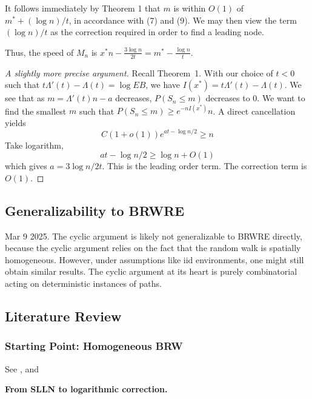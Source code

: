 \begin{tcolorbox}[title=,colback=gray!10,colframe=black,breakable]
It follows immediately by Theorem 1 that $m$ is within $O(1)$ of $m^*+(\log n) / t$, in accordance with (7) and (9). We may then view the term $(\log n) / t$ as the correction required in order to find a leading node.
\end{tcolorbox}

Thus, the speed of $M_n$ is $x^* n - \frac{3 \log n}{2t} = m^* - \frac{\log n}{t}$.

\begin{proof}[A slightly more precise argument]
    Recall Theorem~1. With our choice of $t<0$ such that $t \Lambda'(t) - \Lambda(t) = \log E B$, we have $I(x^*) = t \Lambda'(t) - \Lambda(t)$. We see that as $m = \Lambda'(t) n - a$ decreases, $P(S_n \le m)$ decreases to $0$. We want to find the smallest $m$ such that $P(S_n \le m) \geq e^{- n I(x^*)} n$. A direct cancellation yields
    \[
        C (1 + o(1)) e^{a t - \log n / 2} \geq n
    \]
    Take logarithm,
    \[
        a t - \log n / 2 \geq \log n + O(1)
    \]
    which gives $a = 3 \log n / 2t$. This is the leading order term. The correction term is $O(1)$.
\end{proof}

\subsection{Generalizability to BRWRE}

Mar 9 2025. The cyclic argument is likely not generalizable to BRWRE directly, because the cyclic argument relies on the fact that the random walk is spatially homogeneous. However, under assumptions like iid environments, one might still obtain similar results. The cyclic argument at its heart is purely combinatorial acting on deterministic instances of paths. 

\subsection{Literature Review}

\subsubsection{Starting Point: Homogeneous BRW}

See \cite[Sect.~1]{addario-berryMinimaBranching2009}, and \cite[Sect.~1]{fangBranchingRandom2012}

\textbf{From SLLN to logarithmic correction.}


